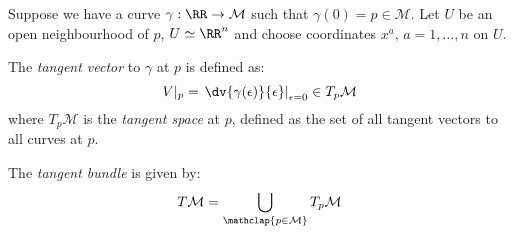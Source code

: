 \documentclass{jknotes}
\begin{document}
Suppose we have a curve \(\gamma:\RR\rightarrow\mathcal{M}\) such that \(\gamma(0) = p \in \mathcal{M}\). Let \(U\) be an open neighbourhood of \(p\), \(U\simeq\RR^n\) and choose coordinates \(x^a\), \(a = 1,\dots,n\) on \(U\).

\begin{defn}
    The \emph{tangent vector} to \(\gamma\) at \(p\) is defined as:
    \begin{equation}
        V|_p = \left.\dv{\gamma(\epsilon)}{\epsilon}\right|_{\epsilon=0}\in T_p\mathcal{M}
    \end{equation}
    where \(T_p\mathcal{M}\) is the \emph{tangent space} at \(p\), defined as the set of all tangent vectors to all curves at \(p\).
    \begin{figure}[H]
        \centering
    \end{figure}
\end{defn}

\begin{defn}
    The \emph{tangent bundle} is given by:
    \begin{equation}
        T\mathcal{M} = \bigcup_{\mathclap{p\in\mathcal{M}}} T_p\mathcal{M}
    \end{equation}
\end{defn}
\end{document}
